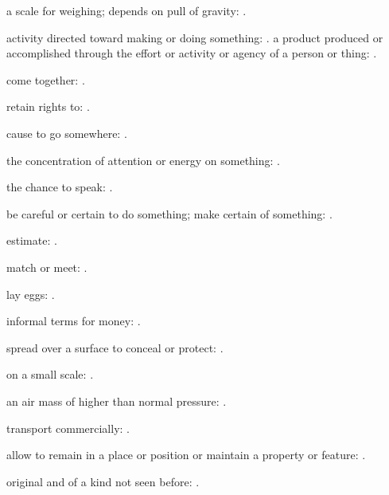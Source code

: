   a scale for weighing; depends on pull of gravity: .

  activity directed toward making or doing something: . a product produced or accomplished through the effort or activity or agency of a person or thing:   .

  come together:   .

  retain rights to:   .

  cause to go somewhere:   .

  the concentration of attention or energy on something:   .

  the chance to speak: .

  be careful or certain to do something; make certain of something:   .

  estimate:   .

  match or meet: .

  lay eggs: .

  informal terms for money:   .

  spread over a surface to conceal or protect: .

  on a small scale: .

  an air mass of higher than normal pressure: .

  transport commercially:   .

  allow to remain in a place or position or maintain a property or feature:   .

  original and of a kind not seen before:   .

